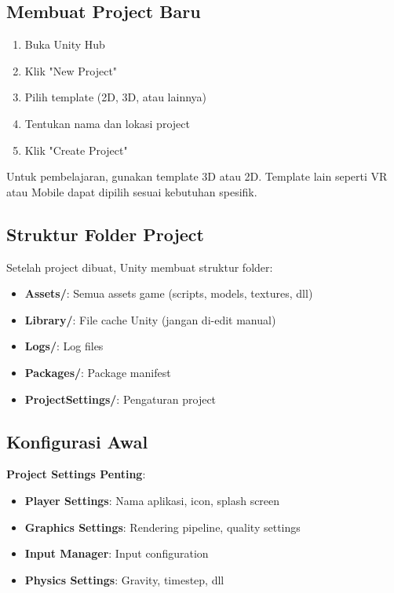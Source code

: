 \subsection{Membuat Project Baru}

\begin{enumerate}
\item Buka Unity Hub
\item Klik "New Project"
\item Pilih template (2D, 3D, atau lainnya)
\item Tentukan nama dan lokasi project
\item Klik "Create Project"
\end{enumerate}

\begin{catatan}
Untuk pembelajaran, gunakan template 3D atau 2D. Template lain seperti VR atau Mobile dapat dipilih sesuai kebutuhan spesifik.
\end{catatan}

\subsection{Struktur Folder Project}

Setelah project dibuat, Unity membuat struktur folder:
\begin{itemize}
\item \textbf{Assets/}: Semua assets game (scripts, models, textures, dll)
\item \textbf{Library/}: File cache Unity (jangan di-edit manual)
\item \textbf{Logs/}: Log files
\item \textbf{Packages/}: Package manifest
\item \textbf{ProjectSettings/}: Pengaturan project
\end{itemize}

\subsection{Konfigurasi Awal}

\textbf{Project Settings Penting}:
\begin{itemize}
\item \textbf{Player Settings}: Nama aplikasi, icon, splash screen
\item \textbf{Graphics Settings}: Rendering pipeline, quality settings
\item \textbf{Input Manager}: Input configuration
\item \textbf{Physics Settings}: Gravity, timestep, dll
\end{itemize}
